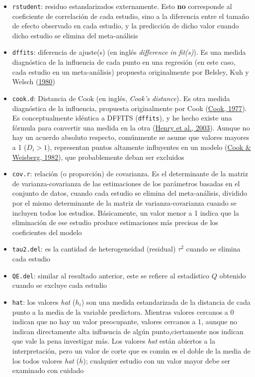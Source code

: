 \documentclass[
  bookmarksnumbered]{article}
\begin{document}
\begin{itemize}
\item
  \texttt{rstudent}: residuo estandarizados externamente. Esto \textbf{no} corresponde al coeficiente de correlación de cada estudio, sino a la diferencia entre el tamaño de efecto observado en cada estudio, y la predicción de dicho valor cuando dicho estudio se elimina del meta-análisis
\item
  \texttt{dffits}: diferencia de ajuste(s) (en inglés \emph{difference in fit(s)}). Es una medida diagnóstica de la influencia de cada punto en una regresión (en este caso, cada estudio en un meta-análisis) propuesta originalmente por Belsley, Kuh y Welsch (\protect\hyperlink{ref-belsleyRegressionDiagnosticsIdentifying1980}{1980})
\item
  \texttt{cook.d}: Distancia de Cook (en inglés, \emph{Cook's distance}). Es otra medida diagnóstica de la influencia, propuesta originalmente por Cook (\protect\hyperlink{ref-cookDetectionInfluentialObservation1977}{Cook, 1977}). Es conceptualmente idéntica a DFFITS (\texttt{dffits}), y he hecho existe una fórmula para convertir una medida en la otra (\protect\hyperlink{ref-Henry2003}{Henry et al., 2003}). Aunque no hay un acuerdo absoluto respecto, comúnmente se asume que valores mayores a 1 (\(D_{i} > 1\)), representan puntos altamente influyentes en un modelo (\protect\hyperlink{ref-cookResidualsInfluenceRegression1982}{Cook \& Weisberg, 1982}), que probablemente deban ser excluidos
\item
  \texttt{cov.r}: relación (o proporción) de covarianza. Es el determinante de la matriz de varianza-covarianza de las estimaciones de los parámetros basadas en el conjunto de datos, cuando cada estudio se elimina del meta-análisis, dividido por el mismo determinante de la matriz de varianza-covarianza cuando se incluyen todos los estudios. Básicamente, un valor menor a 1 indica que la eliminación de ese estudio produce estimaciones más precisas de los coeficientes del modelo
\item
  \texttt{tau2.del}: es la cantidad de heterogeneidad (residual) \(\tau^2\) cuando se elimina cada estudio
\item
  \texttt{QE.del}: similar al resultado anterior, este se refiere al estadístico \(Q\) obtenido cuando se excluye cada estudio
\item
  \texttt{hat}: los valores \emph{hat} (\(h_{i}\)) son una medida estandarizada de la distancia de cada punto a la media de la variable predictora. Mientras valores cercanos a 0 indican que no hay un valor preocupante, valores cercanos a 1, aunque no indican directamente alta influencia de algún punto,ciertamente nos indican que vale la pena investigar más. Los valores \emph{hat} están abiertos a la interpretación, pero un valor de corte que es común es el doble de la media de los todos valores \emph{hat} (\(\overline{h}\)); cualquier estudio con un valor mayor debe ser examinado con cuidado

\end{itemize}
\end{document}
